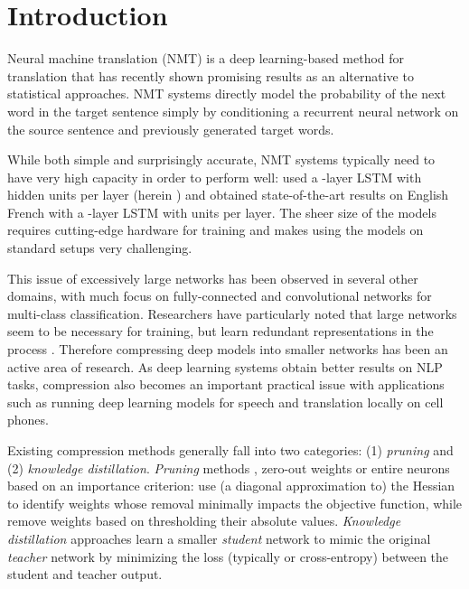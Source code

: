 \documentclass[11pt,letterpaper]{article}
\begin{document}
\section{Introduction}

Neural machine translation (NMT)
\cite{Kalchbrenner2013,Cho2014,Sutskever2014,Bahdanau2015} is a deep learning-based
method for translation that has recently shown promising results as
an alternative to statistical approaches.  NMT systems directly model
the probability of the next word in the target sentence simply by
conditioning a recurrent neural network on the source sentence and
previously generated target words. 

While both simple and surprisingly accurate, NMT systems typically
need to have very high capacity in order to perform well:  
used a -layer LSTM with  hidden
units per layer (herein ) and  obtained
state-of-the-art results on English  French with a
-layer LSTM with  units per layer. The sheer size of the
models requires cutting-edge hardware for training and makes using the
models on standard setups very challenging. 

This issue of excessively large networks has been observed in several
other domains, with much focus on fully-connected and convolutional
networks for multi-class classification. Researchers have particularly
noted that large networks seem to be necessary for training, but learn
redundant representations in the process \cite{Denil2013}. Therefore compressing deep models into
smaller networks has been an active area of research. As deep learning
systems obtain better results on NLP tasks, compression also becomes
an important practical issue with applications such as running
deep learning models for speech and translation locally on
cell phones.

Existing compression methods generally fall into two categories: (1)
\textit{pruning} and (2) \textit{knowledge distillation}.
\textit{Pruning} methods 
\cite{LeCun1990,He2014,Han2016}, zero-out weights or entire neurons
based on an importance criterion:  use (a diagonal approximation to) the
Hessian to identify weights whose removal minimally impacts the
objective function, while  remove
weights based on thresholding their absolute values. 
\textit{Knowledge distillation} approaches
\cite{Bucila2006,Ba2014,Hinton2015} learn
a smaller \textit{student} network to mimic the original
\textit{teacher} network by minimizing the loss (typically  or
cross-entropy) between the student and teacher output. 
\end{document}
